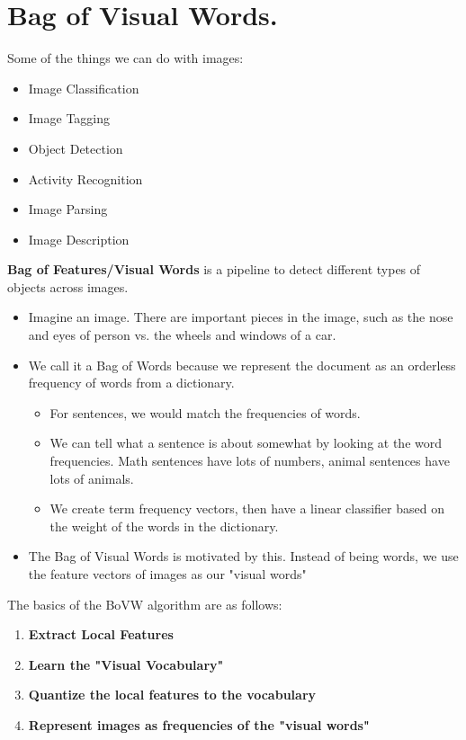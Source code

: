 \documentclass{article}
\begin{document}
\section{Bag of Visual Words.}
Some of the things we can do with images:
\begin{itemize}
    \item Image Classification
    \item Image Tagging
    \item Object Detection
    \item Activity Recognition
    \item Image Parsing
    \item Image Description
\end{itemize}
\textbf{Bag of Features/Visual Words} is a pipeline to detect different types of objects across images. 
\begin{itemize}
    \item Imagine an image. There are important pieces in the image, such as the nose and eyes of person vs. the wheels and windows of a car. 
    \item We call it a Bag of Words because we represent the document as an orderless frequency of words from a dictionary.
    \begin{itemize}
        \item For sentences, we would match the frequencies of words.
        \item We can tell what a sentence is about somewhat by looking at the word frequencies. Math sentences have lots of numbers, animal sentences have lots of animals.
        \item We create term frequency vectors, then have a linear classifier based on the weight of the words in the dictionary.
    \end{itemize}
    \item The Bag of Visual Words is motivated by this. Instead of being words, we use the feature vectors of images as our "visual words"
\end{itemize}
The basics of the BoVW algorithm are as follows:
\begin{enumerate}
    \item \textbf{Extract Local Features}
    \item \textbf{Learn the "Visual Vocabulary"}
    \item \textbf{Quantize the local features to the vocabulary}
    \item \textbf{Represent images as frequencies of the "visual words"}
\end{enumerate}
\end{document}
